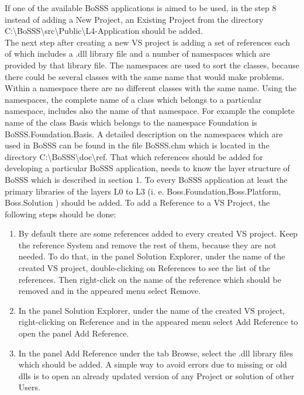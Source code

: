 \documentclass[11pt,twoside,a4paper]{fdyartcl}
\begin{document}
If one of the available BoSSS applications is aimed to be used, in the step 8 instead of adding a {\scriptsize New Project}, an {\scriptsize Existing Project} from the directory {\scriptsize C:\textbackslash BoSSS\textbackslash src\textbackslash Public\textbackslash L4-Application} should be added.\\
The next step after creating a new VS project is adding a set of references each of which includes a {\scriptsize .dll} library file and a number of namespaces which are provided by that library file. The namespaces are used to sort the classes, because there could be several classes with the same name that would make problems. Within a namespace there are no different classes with the same name. Using the namespaces, the complete name of a class which belongs to a particular namespace, includes also the name of that namespace. For example the complete name of the class {\scriptsize Basis} which belongs to the namespace {\scriptsize Foundation} is {\scriptsize BoSSS.Foundation.Basis}. A detailed description on the namespaces which are used in BoSSS can be found in the file {\scriptsize BoSSS.chm} which is located in the directory {\scriptsize C:\textbackslash BoSSS\textbackslash doc\textbackslash ref}. That which references should be added for developing a particular BoSSS application, needs to know the layer structure of BoSSS which is described in section 1. To every BoSSS application at least the primary libraries of the layers L0 to L3 (i. e. {\scriptsize Boss.Foundation},{\scriptsize Boss.Platform}, {\scriptsize Boss.Solution}  ) should be added. To add a Reference to a VS Project, the following steps should be done:
\begin{enumerate}
\item By default there are some references added to every created VS project. Keep the reference {\scriptsize System} and remove the rest of them, because they are not needed. To do that, in the panel {\scriptsize Solution Explorer}, under the name of the created VS project, double-clicking on {\scriptsize References} to see the list of the references. Then right-click on the name of the reference which should be removed and in the appeared menu select {\scriptsize Remove}.
\item In the panel {\scriptsize Solution Explorer}, under the name of the created VS project, right-clicking on {\scriptsize Reference} and in the appeared menu select {\scriptsize Add Reference} to open the panel {\scriptsize Add Reference}.
\item In the panel {\scriptsize Add Reference} under the tab {\scriptsize Browse}, select the {\scriptsize .dll} library files which should be added. A simple way to avoid errors due to missing or old dlls is to open an already updated version of any Project or solution of other Users.
\end{enumerate}
\end{document}
